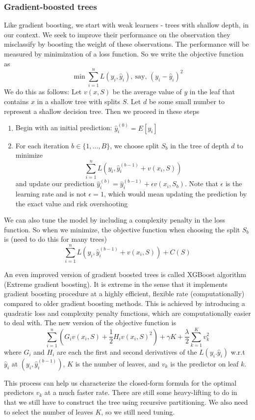 \documentclass[12pt]{article}
\theoremstyle{definition}
\theoremstyle{property}
\theoremstyle{assumption}
\theoremstyle{example}
\theoremstyle{comment}
\begin{document}
\subsubsection{Gradient-boosted trees}
Like gradient boosting, we start with weak learners - trees with shallow depth, in our context. We seek to improve their performance on the observation they misclassify by boosting the weight of these observations. The performance will be measured by minimization of a loss function. So we write the objective function as
\[
\min \sum_{i=1}^n L(y_i,\hat{y}_i), \ \text{say, } (y_i-\hat{y}_i)^2
\] 
We do this as follows: Let $v(x,S)$ be the average value of $y$ in the leaf that contains $x$ in a shallow tree with splits $S$. Let $d$ be some small number to represent a shallow decision tree. Then we proceed in these steps
\begin{enumerate}
\item Begin with an initial prediction: $\hat{y}_i^{(0)}=E[y_i]$
\item For each iteration $b\in\{1,...,B\}$, we choose split $S_b$ in the tree of depth $d$ to minimize
\[
\sum_{i=1}^n L(y_i, \hat{y}_i^{(b-1)}+v(x_i,S) )
\]
and update our prediction $\hat{y}_i^{(b)}= \hat{y}_i^{(b-1)}+\epsilon v(x_i,S_b)$. Note that $\epsilon$ is the learning rate and is not $\epsilon=1$, which would mean updating the prediction by the exact value and risk overshooting
\end{enumerate}\par
We can also tune the model by including a complexity penalty in the loss function. So when we minimize, the objective function when choosing the split $S_b$ is (need to do this for many trees)
\[
\sum_{i=1}^n L(y_i, \hat{y}_i^{(b-1)}+v(x_i,S) ) + C(S)
\]\par
An even improved version of gradient boosted trees is called XGBoost algorithm (Extreme gradient boosting). It is extreme in the sense that it implements gradient boosting procedure at a highly efficient, flexible rate (computationally) compared to older gradient boosting methods. This is achieved by introducing a quadratic loss and complexity penalty functions, which are computationally easier to deal with. The new version of the objective function is
\[
\sum_{i=1}^n (G_iv(x_i, S)+\frac{1}{2} H_i v(x_i,S)^2)+ \gamma K + \frac{\lambda}{2}\sum_{k=1}^K v_k^2
\]
where $G_i$ and $H_i$ are each the first and second derivatives of the $L(y_i. \hat{y}_i)$ w.r.t $\hat{y}_i$ at $(y_i, \hat{y}_i^{(b-1)})$, $K$ is the number of leaves, and $v_k$ is the predictor on leaf $k$. \par
This process can help us characterize the closed-form formula for the optimal predictors $v_k$ at a much faster rate. There are still some heavy-lifting to do in that we still have to construct the tree using recursive partitioning. We also need to select the number of leaves $K$, so we still need tuning. 
\end{document}
